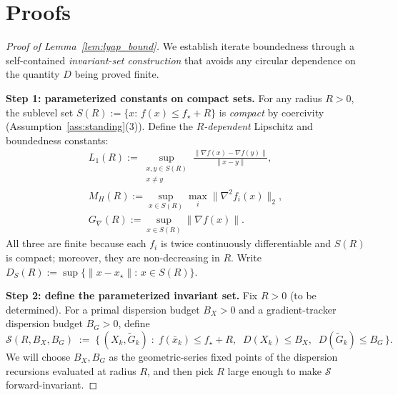 \documentclass[11pt,a4paper]{article}
\begin{document}

\section{Proofs}\label{app:proofs}

\begin{proof}[Proof of Lemma~\ref{lem:lyap_bound}]
We establish iterate boundedness through a self-contained
\emph{invariant-set construction} that avoids any circular dependence
on the quantity $D$ being proved finite.

\smallskip
\noindent\textbf{Step 1: parameterized constants on compact sets.}
For any radius $R>0$, the sublevel set
$S(R):=\{x:\,f(x)\le f_\star+R\}$
is \emph{compact} by coercivity (Assumption~\ref{ass:standing}(3)).
Define the \emph{$R$-dependent} Lipschitz and boundedness constants:
\begin{gather*}
  L_1(R):=\sup_{\substack{x,y\in S(R)\\x\ne y}}\frac{\|\nabla f(x)-\nabla f(y)\|}{\|x-y\|},\\
  M_H(R):=\sup_{x\in S(R)}\max_i\|\nabla^2 f_i(x)\|_2,\\
  G_\nabla(R):=\sup_{x\in S(R)}\|\nabla f(x)\|.
\end{gather*}
All three are finite because each $f_i$ is twice continuously differentiable
and $S(R)$ is compact; moreover, they are non-decreasing in $R$.
Write $D_S(R):=\sup\{\|x-x_\star\|:\,x\in S(R)\}$.

\smallskip
\noindent\textbf{Step 2: define the parameterized invariant set.}
Fix $R>0$ (to be determined).
For a primal dispersion budget $B_X>0$ and a gradient-tracker
dispersion budget $B_G>0$, define
\[
  \mathcal S(R,B_X,B_G) \;:=\;
  \bigl\{\,(X_k,\tilde G_k)\;:\;
  f(\bar x_k)\le f_\star+R,\;\;
  D(X_k)\le B_X,\;\;
  D(\tilde G_k)\le B_G
  \,\bigr\}.
\]
We will choose $B_X,B_G$ as the geometric-series fixed points of the
dispersion recursions evaluated at radius $R$, and then pick $R$ large
enough to make $\mathcal S$ forward-invariant.


\end{proof}
\end{document}
